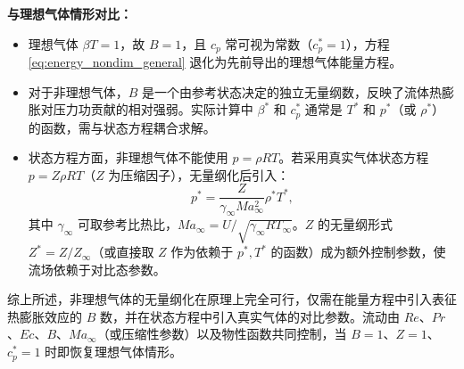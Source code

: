 \documentclass[12pt, a4paper, oneside, UTF8]{ctexbook}  %
\begin{document}
\textbf{与理想气体情形对比：}
\begin{itemize}
    \item 理想气体 $\beta T = 1$，故 $B = 1$，且 $c_p$ 常可视为常数（$c_p^*=1$），方程 \eqref{eq:energy_nondim_general} 退化为先前导出的理想气体能量方程。
    \item 对于非理想气体，$B$ 是一个由参考状态决定的独立无量纲数，反映了流体热膨胀对压力功贡献的相对强弱。实际计算中 $\beta^*$ 和 $c_p^*$ 通常是 $T^*$ 和 $p^*$（或 $\rho^*$）的函数，需与状态方程耦合求解。
    \item 状态方程方面，非理想气体不能使用 $p = \rho R T$。若采用真实气体状态方程 $p = Z \rho R T$（$Z$ 为压缩因子），无量纲化后引入：
    \begin{equation}
        p^* = \frac{Z}{\gamma_\infty Ma_\infty^2} \rho^* T^*,
    \end{equation}
    其中 $\gamma_\infty$ 可取参考比热比，$Ma_\infty = U/\sqrt{\gamma_\infty R T_\infty}$。$Z$ 的无量纲形式 $Z^* = Z/Z_\infty$（或直接取 $Z$ 作为依赖于 $p^*, T^*$ 的函数）成为额外控制参数，使流场依赖于对比态参数。
\end{itemize}

综上所述，非理想气体的无量纲化在原理上完全可行，仅需在能量方程中引入表征热膨胀效应的 $B$ 数，并在状态方程中引入真实气体的对比参数。流动由 $Re$、$Pr$、$Ec$、$B$、$Ma_\infty$（或压缩性参数）以及物性函数共同控制，当 $B=1$、$Z=1$、$c_p^*=1$ 时即恢复理想气体情形。



\end{document}
